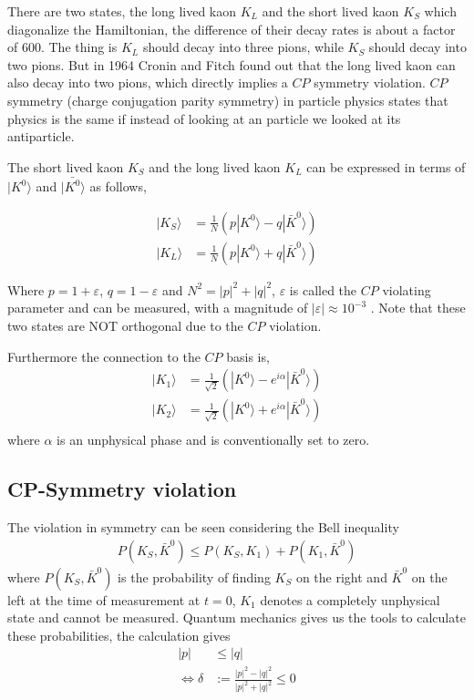 \documentclass[a4paper]{article}
\begin{document}
There are two states, the long lived kaon $K_L$ and the short lived kaon $K_S$
which diagonalize the Hamiltonian,
the difference of their decay rates is about a factor of $600$.
The thing is $K_L$ should decay into three pions, while $K_S$ should decay
into two pions. But in 1964 Cronin and Fitch found out that the long lived
kaon can also decay into two pions, which directly implies a $CP$ symmetry violation.
$CP$ symmetry (charge conjugation parity symmetry) in particle physics states
that physics is the same if instead of looking at an particle we looked at its
antiparticle.

The short lived kaon $K_S$ and the long lived kaon $K_L$ can be expressed in
terms of $|K^0\rangle$ and $|\bar{K^0}\rangle$ as follows,

\begin{align}
    |K_S\rangle &=  \frac{1}{N}(p|K^0\rangle - q|\bar{K}^0\rangle) \\
    |K_L\rangle &=  \frac{1}{N}(p|K^0\rangle + q|\bar{K}^0\rangle)
\end{align}

Where $p = 1+\varepsilon$, $q=1-\varepsilon$ and $N^2 = |p|^2 + |q|^2$,
$\varepsilon$ is called the $CP$ violating parameter and can be measured, with
a magnitude of $|\varepsilon| \approx 10^{-3}$ \cite{Bertlmann} . Note
that these two states are NOT orthogonal due to the $CP$ violation.


Furthermore the connection to the $CP$ basis is,
\begin{align}
    |K_1\rangle &=  \frac{1}{\sqrt{2}}(|K^0\rangle - e^{i\alpha}|\bar{K}^0\rangle) \\
    |K_2\rangle &=  \frac{1}{\sqrt{2}}(|K^0\rangle + e^{i\alpha}|\bar{K}^0\rangle) \\
\end{align}
where $\alpha$ is an unphysical phase and is conventionally set to zero.


\subsection{CP-Symmetry violation}
The violation in symmetry can be seen considering the Bell inequality
\begin{align}\label{eq:leqk}
    P(K_S, \bar{K}^0) \leq P(K_S, K_1) + P(K_1, \bar{K}^0)
\end{align}
where $P(K_S, \bar{K}^0)$ is the probability of finding $K_S$ on the right and
$\bar{K}^0$ on the left at the time of measurement at $t=0$, $K_1$ denotes a
completely unphysical state and cannot be measured. Quantum mechanics gives us
the tools to calculate these probabilities, the calculation gives
\begin{align}
    |p|&\leq |q|\\
    \Leftrightarrow \delta &:= \frac{|p|^2 - |q|^2}{|p|^2+|q|^2} \leq 0
\end{align}
\end{document}
